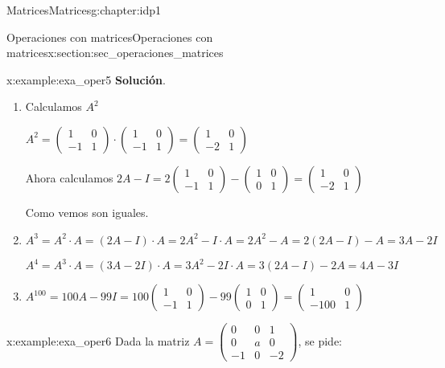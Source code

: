 \documentclass[oneside,12pt,]{book}
\newcommand{\blocktitlefont}{\relax}
\newcommand{\amp}{&}
\begin{document}
\begin{chapterptx}{Matrices}{}{Matrices}{}{}{g:chapter:idp1}
\begin{sectionptx}{Operaciones con matrices}{}{Operaciones con matrices}{}{}{x:section:sec_operaciones_matrices}
\begin{example}{}{x:example:exa_oper5}
\noindent\textbf{\blocktitlefont Solución}.\hypertarget{g:solution:idp13}{}\quad{}%
\begin{enumerate}[label=\alph*]
\item{}Calculamos \(A^2\)%
\par
\(A^2=\begin{pmatrix} 1 \amp 0 \\ -1 \amp 1 \end{pmatrix} \cdot\begin{pmatrix} 1 \amp 0 \\ -1 \amp 1 \end{pmatrix}= \begin{pmatrix} 1 \amp 0 \\ -2 \amp 1 \end{pmatrix}\)%
\par
Ahora calculamos \(2A-I=2\begin{pmatrix} 1 \amp 0 \\ -1 \amp 1 \end{pmatrix}- \begin{pmatrix} 1 \amp 0 \\ 0 \amp 1 \end{pmatrix}=\begin{pmatrix} 1 \amp 0 \\ -2 \amp 1 \end{pmatrix}\)%
\par
Como vemos son iguales.%
\item{}\(A^3=A^2\cdot A= (2A-I)\cdot A= 2A^2-I\cdot A=2A^2-A=2(2A-I)-A=3A-2I\)%
\par
\(A^4=A^3\cdot A=(3A-2I)\cdot A=3A^2-2I\cdot A= 3(2A-I)-2A=4A-3I\)%
\item{}\(\displaystyle A^{100}=100A-99I=100\begin{pmatrix} 1 \amp 0 \\ -1 \amp 1 \end{pmatrix}- 99\begin{pmatrix} 1 \amp 0 \\ 0 \amp 1 \end{pmatrix}=  \begin{pmatrix} 1 \amp 0 \\ -100 \amp 1 \end{pmatrix}\)%
\end{enumerate}
%
\end{example}
\begin{example}{}{x:example:exa_oper6}%
Dada la matriz \(A=\begin{pmatrix}  0 \amp 0 \amp 1 \\  0 \amp a \amp 0 \\ -1 \amp 0 \amp -2 \end{pmatrix} \), se pide:%

\end{example}
\end{sectionptx}
\end{chapterptx}
\end{document}
